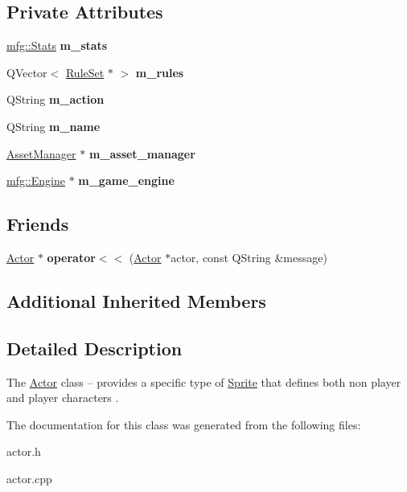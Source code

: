 \subsection*{Private Attributes}
\begin{DoxyCompactItemize}
\item 
\mbox{\label{class_actor_a6ceacbad9e2f687e035f1dbb6025b41e}} 
\hyperlink{structmfg_1_1_stats}{mfg\+::\+Stats} {\bfseries m\+\_\+stats}
\item 
\mbox{\label{class_actor_a6e4a97f36f8f4b8516fdb315b0f68543}} 
Q\+Vector$<$ \hyperlink{class_rule_set}{Rule\+Set} $\ast$ $>$ {\bfseries m\+\_\+rules}
\item 
\mbox{\label{class_actor_ae3c7bb3e0a6548749b14b6d38b5b50ac}} 
Q\+String {\bfseries m\+\_\+action}
\item 
\mbox{\label{class_actor_a487d4e428e72810694df2bc7885f3cff}} 
Q\+String {\bfseries m\+\_\+name}
\item 
\mbox{\label{class_actor_a68280d58a3ca52e36b826dcce8d4599b}} 
\hyperlink{class_asset_manager}{Asset\+Manager} $\ast$ {\bfseries m\+\_\+asset\+\_\+manager}
\item 
\mbox{\label{class_actor_aab6640a44131bbabd6f02bc396afdbf0}} 
\hyperlink{classmfg_1_1_engine}{mfg\+::\+Engine} $\ast$ {\bfseries m\+\_\+game\+\_\+engine}
\end{DoxyCompactItemize}
\subsection*{Friends}
\begin{DoxyCompactItemize}
\item 
\mbox{\label{class_actor_af3ffe8761cd2ebd2b92033654d49a2e7}} 
\hyperlink{class_actor}{Actor} $\ast$ {\bfseries operator$<$$<$} (\hyperlink{class_actor}{Actor} $\ast$actor, const Q\+String \&message)
\end{DoxyCompactItemize}
\subsection*{Additional Inherited Members}


\subsection{Detailed Description}
The \hyperlink{class_actor}{Actor} class -- provides a specific type of \hyperlink{class_sprite}{Sprite} that defines both non player and player characters . 

The documentation for this class was generated from the following files\+:\begin{DoxyCompactItemize}
\item 
actor.\+h\item 
actor.\+cpp\end{DoxyCompactItemize}
